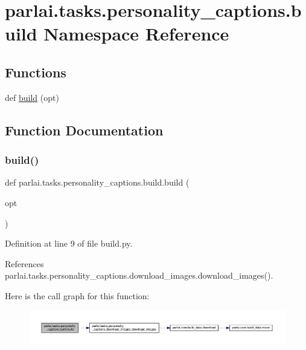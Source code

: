 \hypertarget{namespaceparlai_1_1tasks_1_1personality__captions_1_1build}{}\section{parlai.\+tasks.\+personality\+\_\+captions.\+build Namespace Reference}
\label{namespaceparlai_1_1tasks_1_1personality__captions_1_1build}
\subsection*{Functions}
\begin{DoxyCompactItemize}
\item 
def \hyperlink{namespaceparlai_1_1tasks_1_1personality__captions_1_1build_a74a7207f7a37bbac7c1f1b17bb5a2080}{build} (opt)
\end{DoxyCompactItemize}


\subsection{Function Documentation}
\mbox{\label{namespaceparlai_1_1tasks_1_1personality__captions_1_1build_a74a7207f7a37bbac7c1f1b17bb5a2080}} 
\subsubsection{\texorpdfstring{build()}{build()}}
{\footnotesize\ttfamily def parlai.\+tasks.\+personality\+\_\+captions.\+build.\+build (\begin{DoxyParamCaption}\item[{}]{opt }\end{DoxyParamCaption})}



Definition at line 9 of file build.\+py.



References parlai.\+tasks.\+personality\+\_\+captions.\+download\+\_\+images.\+download\+\_\+images().

Here is the call graph for this function\+:
\nopagebreak
\begin{figure}[H]
\begin{center}
\leavevmode
\includegraphics[width=350pt]{namespaceparlai_1_1tasks_1_1personality__captions_1_1build_a74a7207f7a37bbac7c1f1b17bb5a2080_cgraph}
\end{center}
\end{figure}
